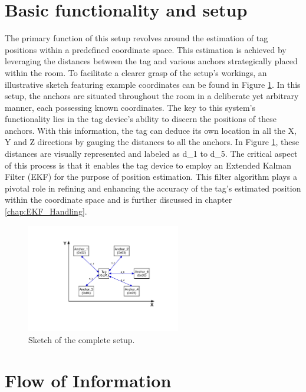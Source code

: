 \section{Basic functionality and setup}
The primary function of this setup revolves around the estimation of tag positions within a predefined coordinate space. 
This estimation is achieved by leveraging the distances between the tag and various anchors strategically placed within the room. 
To facilitate a clearer grasp of the setup's workings, an illustrative sketch featuring example coordinates can be found in Figure \ref{fig:setup_sketch}.
\vspace{4pt}
\newline
In this setup, the anchors are situated throughout the room in a deliberate yet arbitrary manner, each possessing known coordinates. 
The key to this system's functionality lies in the tag device's ability to discern the positions of these anchors. 
With this information, the tag can deduce its own location in all the X, Y and Z directions by gauging the distances to all the anchors.
\vspace{4pt}
\newline
In Figure \ref{fig:setup_sketch}, these distances are visually represented and labeled as d\_1 to d\_5. 
The critical aspect of this process is that it enables the tag device to employ an Extended Kalman Filter (EKF) for the purpose of position estimation. 
This filter algorithm plays a pivotal role in refining and enhancing the accuracy of the tag's estimated position within the coordinate space and is further discussed in chapter \ref{chap:EKF_Handling}. 

\begin{figure}[!hbt]
	\centering
	\includegraphics[width=0.6\textwidth]{pictures/Complete_Setup.pdf}
	\caption{Sketch of the complete setup.}
	\label{fig:setup_sketch}
\end{figure}

\section{Flow of Information}

